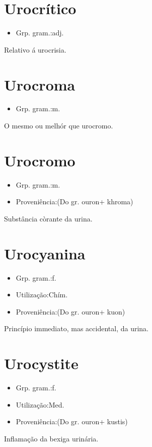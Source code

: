 \documentclass{article}
\begin{document}
\section{Urocrítico}
\begin{itemize}
\item {Grp. gram.:adj.}
\end{itemize}
Relativo á urocrisia.
\section{Urocroma}
\begin{itemize}
\item {Grp. gram.:m.}
\end{itemize}
O mesmo ou melhór que \textunderscore urocromo\textunderscore .
\section{Urocromo}
\begin{itemize}
\item {Grp. gram.:m.}
\end{itemize}
\begin{itemize}
\item {Proveniência:(Do gr. \textunderscore ouron\textunderscore  + \textunderscore khroma\textunderscore )}
\end{itemize}
Substância còrante da urina.
\section{Urocyanina}
\begin{itemize}
\item {Grp. gram.:f.}
\end{itemize}
\begin{itemize}
\item {Utilização:Chím.}
\end{itemize}
\begin{itemize}
\item {Proveniência:(Do gr. \textunderscore ouron\textunderscore  + \textunderscore kuon\textunderscore )}
\end{itemize}
Princípio immediato, mas accidental, da urina.
\section{Urocystite}
\begin{itemize}
\item {Grp. gram.:f.}
\end{itemize}
\begin{itemize}
\item {Utilização:Med.}
\end{itemize}
\begin{itemize}
\item {Proveniência:(Do gr. \textunderscore ouron\textunderscore  + \textunderscore kustis\textunderscore )}
\end{itemize}
Inflamação da bexiga urinária.
\end{document}
